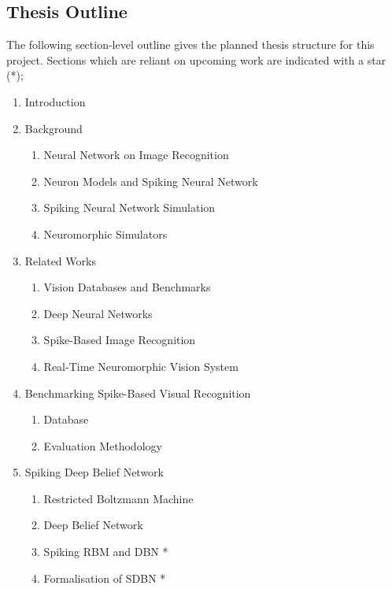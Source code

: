 \documentclass[journal]{journal}
\begin{document}


\begin{appendices}
	\section{Thesis Outline}
	\label{app:thesis}
	The following section-level outline gives the planned thesis structure for this project.
	Sections which are reliant on upcoming work are indicated with a star (*);
	\begin{enumerate}
		\item Introduction
		\item Background
			\begin{enumerate}
				\item Neural Network on Image Recognition
				\item Neuron Models and Spiking Neural Network
				\item Spiking Neural Network Simulation
				\item Neuromorphic Simulators
			\end{enumerate}	
		\item Related Works
			\begin{enumerate}
				\item Vision Databases and Benchmarks
				\item Deep Neural Networks
				\item Spike-Based Image Recognition
				\item Real-Time Neuromorphic Vision System
			\end{enumerate}
		\item Benchmarking Spike-Based Visual Recognition
			\begin{enumerate}
				\item Database
				\item Evaluation Methodology
			\end{enumerate}
		\item Spiking Deep Belief Network
			\begin{enumerate}
				\item Restricted Boltzmann Machine  
				\item Deep Belief Network
				\item Spiking RBM and DBN *
				\item Formalisation of SDBN *

\end{enumerate}
\end{enumerate}
\end{appendices}
\end{document}
